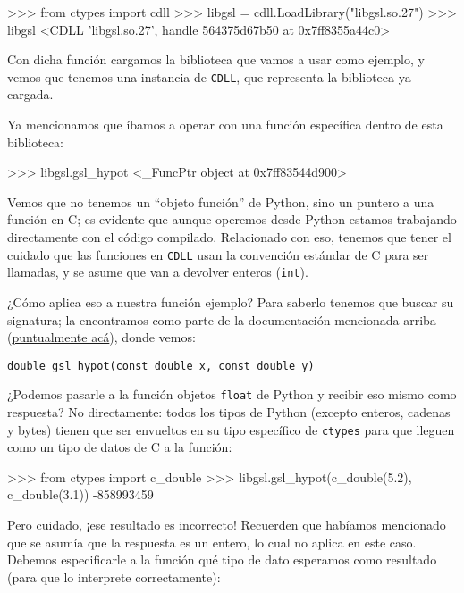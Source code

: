 \begin{py}
>>> from ctypes import cdll
>>> libgsl = cdll.LoadLibrary("libgsl.so.27")
>>> libgsl
<CDLL 'libgsl.so.27', handle 564375d67b50 at 0x7ff8355a44c0>
\end{py}

Con dicha función cargamos la biblioteca que vamos a usar como ejemplo, y vemos que tenemos una instancia de \texttt{CDLL}, que representa la biblioteca ya cargada.

Ya mencionamos que íbamos a operar con una función específica dentro de esta biblioteca:

\begin{py}
>>> libgsl.gsl_hypot
<_FuncPtr object at 0x7ff83544d900>
\end{py}

Vemos que no tenemos un ``objeto función'' de Python, sino un puntero a una función en C; es evidente que aunque operemos desde Python estamos trabajando directamente con el código compilado. Relacionado con eso, tenemos que tener el cuidado que las funciones en \texttt{CDLL} usan la convención estándar de C para ser llamadas, y se asume que van a devolver enteros (\texttt{int}).

¿Cómo aplica eso a nuestra función ejemplo? Para saberlo tenemos que buscar su signatura; la encontramos como parte de la documentación mencionada arriba (\href{https://www.gnu.org/savannah-checkouts/gnu/gsl/doc/html/math.html#c.gsl_hypot}{puntualmente acá}), donde vemos:

\begin{verbatim}
double gsl_hypot(const double x, const double y)
\end{verbatim}

¿Podemos pasarle a la función objetos \texttt{float} de Python y recibir eso mismo como respuesta? No directamente: todos los tipos de Python (excepto enteros, cadenas y bytes) tienen que ser envueltos en su tipo específico de \texttt{ctypes} para que lleguen como un tipo de datos de C a la función:

\begin{py}
>>> from ctypes import c_double
>>> libgsl.gsl_hypot(c_double(5.2), c_double(3.1))
-858993459
\end{py}

Pero cuidado, ¡ese resultado es incorrecto! Recuerden que habíamos mencionado que se asumía que la respuesta es un entero, lo cual no aplica en este caso. Debemos especificarle a la función qué tipo de dato esperamos como resultado (para que lo interprete correctamente):


